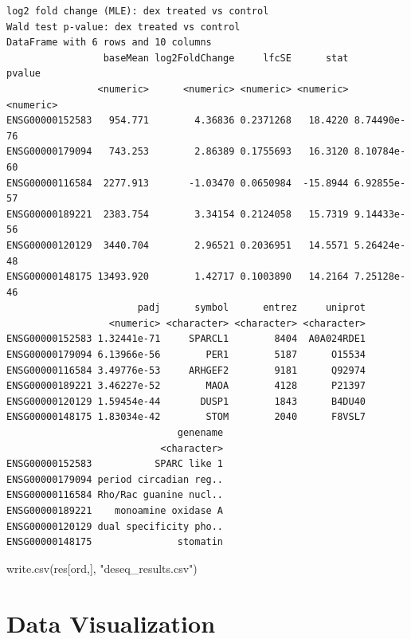 \documentclass[
  letterpaper,
  DIV=11,
  numbers=noendperiod]{scrartcl}
\newenvironment{Shaded}{\begin{snugshade}}{\end{snugshade}}
\newcommand{\AttributeTok}[1]{\textcolor[rgb]{0.40,0.45,0.13}{#1}}
\newcommand{\FunctionTok}[1]{\textcolor[rgb]{0.28,0.35,0.67}{#1}}
\newcommand{\NormalTok}[1]{\textcolor[rgb]{0.00,0.23,0.31}{#1}}
\newcommand{\SpecialCharTok}[1]{\textcolor[rgb]{0.37,0.37,0.37}{#1}}
\newcommand{\StringTok}[1]{\textcolor[rgb]{0.13,0.47,0.30}{#1}}
\begin{document}
\begin{verbatim}
log2 fold change (MLE): dex treated vs control 
Wald test p-value: dex treated vs control 
DataFrame with 6 rows and 10 columns
                 baseMean log2FoldChange     lfcSE      stat      pvalue
                <numeric>      <numeric> <numeric> <numeric>   <numeric>
ENSG00000152583   954.771        4.36836 0.2371268   18.4220 8.74490e-76
ENSG00000179094   743.253        2.86389 0.1755693   16.3120 8.10784e-60
ENSG00000116584  2277.913       -1.03470 0.0650984  -15.8944 6.92855e-57
ENSG00000189221  2383.754        3.34154 0.2124058   15.7319 9.14433e-56
ENSG00000120129  3440.704        2.96521 0.2036951   14.5571 5.26424e-48
ENSG00000148175 13493.920        1.42717 0.1003890   14.2164 7.25128e-46
                       padj      symbol      entrez     uniprot
                  <numeric> <character> <character> <character>
ENSG00000152583 1.32441e-71     SPARCL1        8404  A0A024RDE1
ENSG00000179094 6.13966e-56        PER1        5187      O15534
ENSG00000116584 3.49776e-53     ARHGEF2        9181      Q92974
ENSG00000189221 3.46227e-52        MAOA        4128      P21397
ENSG00000120129 1.59454e-44       DUSP1        1843      B4DU40
ENSG00000148175 1.83034e-42        STOM        2040      F8VSL7
                              genename
                           <character>
ENSG00000152583           SPARC like 1
ENSG00000179094 period circadian reg..
ENSG00000116584 Rho/Rac guanine nucl..
ENSG00000189221    monoamine oxidase A
ENSG00000120129 dual specificity pho..
ENSG00000148175               stomatin
\end{verbatim}

\begin{Shaded}
\begin{Highlighting}[]
\FunctionTok{write.csv}\NormalTok{(res[ord,], }\StringTok{"deseq\_results.csv"}\NormalTok{)}
\end{Highlighting}
\end{Shaded}

\hypertarget{data-visualization}{%
\section{Data Visualization}\label{data-visualization}}

\begin{Shaded}
\end{Shaded}
\end{document}
